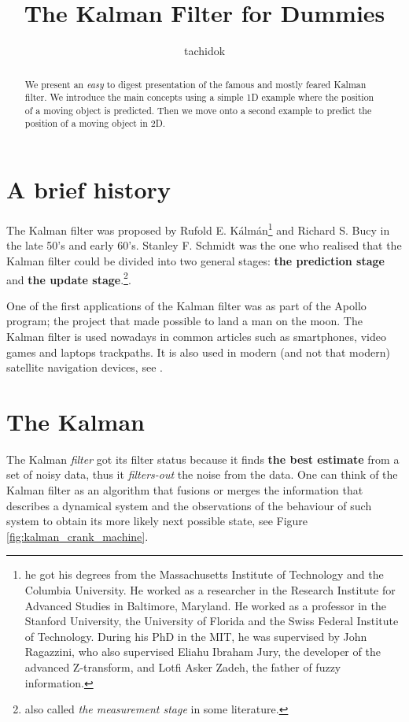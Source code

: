 \documentclass[12pt,a4paper,final]{article} %
\author{tachidok}
\title{The Kalman Filter for Dummies}
\date{ }
\begin{document}
\maketitle

\begin{abstract}
 We present an \textit{easy} to digest presentation of the
  famous and mostly feared Kalman filter. We introduce the main
  concepts using a simple 1D example where the position of a moving
  object is predicted. Then we move onto a second example to predict
  the position of a moving object in 2D.
\end{abstract}

\section{A brief history}
\label{sec:brief_history}

The Kalman filter was proposed by Rufold E. K\'alm\'an\footnote{he got
  his degrees from the Massachusetts Institute of Technology and the
  Columbia University. He worked as a researcher in the Research
  Institute for Advanced Studies in Baltimore, Maryland. He worked as
  a professor in the Stanford University, the University of Florida
  and the Swiss Federal Institute of Technology. During his PhD in the
  MIT, he was supervised by John Ragazzini, who also supervised Eliahu
  Ibraham Jury, the developer of the advanced Z-transform, and Lotfi
  Asker Zadeh, the father of fuzzy information.} and Richard S. Bucy
in the late 50's and early 60's. Stanley F. Schmidt was the one who
realised that the Kalman filter could be divided into two general
stages: \textbf{the prediction stage} and \textbf{the update
  stage}.\footnote{also called \textit{the measurement stage} in some
  literature.}.

One of the first applications of the Kalman filter was as part of the
Apollo program; the project that made possible to land a man on the
moon. The Kalman filter is used nowadays in common articles such as
smartphones, video games and laptops trackpaths. It is also used in
modern (and not that modern) satellite navigation devices, see
\cite{Faragher:2012:AR}.

\section{The Kalman}
The Kalman \textit{filter} got its filter status because it finds
\textbf{the best estimate} from a set of noisy data, thus it
\textit{filters-out} the noise from the data. One can think of the
Kalman filter as an algorithm that fusions or merges the information
that describes a dynamical system and the observations of the
behaviour of such system to obtain its more likely next possible
state, see Figure \ref{fig:kalman_crank_machine}.
\end{document}
